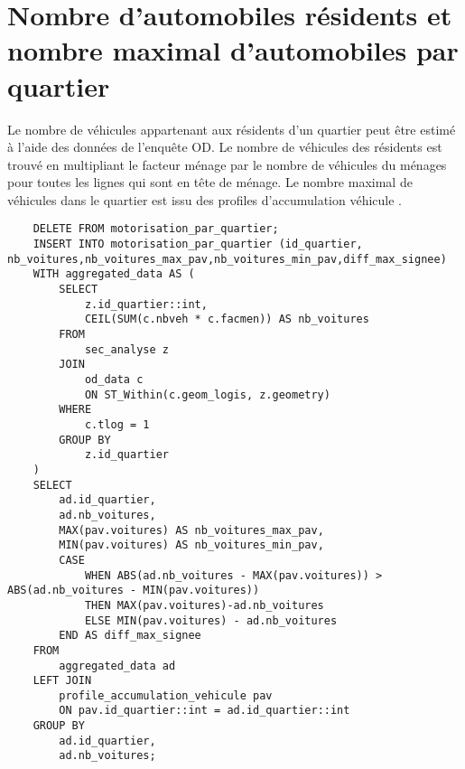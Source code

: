 \section{Nombre d'automobiles résidents et nombre maximal d'automobiles par quartier}\label{sec:annex_motorisation_par_quartier}
Le nombre de véhicules appartenant aux résidents d'un quartier peut être estimé à l'aide des données de l'enquête OD. Le nombre de véhicules des résidents est trouvé en multipliant le facteur ménage par le nombre de véhicules du ménages pour toutes les lignes qui sont en tête de ménage. Le nombre maximal de véhicules dans le quartier est issu des profiles d'accumulation véhicule \parencite{diallo_methodology_2015}.
\begin{lstlisting}
    DELETE FROM motorisation_par_quartier;
    INSERT INTO motorisation_par_quartier (id_quartier, nb_voitures,nb_voitures_max_pav,nb_voitures_min_pav,diff_max_signee)
    WITH aggregated_data AS (
        SELECT
            z.id_quartier::int,
            CEIL(SUM(c.nbveh * c.facmen)) AS nb_voitures
        FROM
            sec_analyse z
        JOIN
            od_data c
            ON ST_Within(c.geom_logis, z.geometry)
        WHERE
            c.tlog = 1
        GROUP BY
            z.id_quartier
    )
    SELECT
        ad.id_quartier,
        ad.nb_voitures,
        MAX(pav.voitures) AS nb_voitures_max_pav,
        MIN(pav.voitures) AS nb_voitures_min_pav,
        CASE
            WHEN ABS(ad.nb_voitures - MAX(pav.voitures)) > ABS(ad.nb_voitures - MIN(pav.voitures))
            THEN MAX(pav.voitures)-ad.nb_voitures
            ELSE MIN(pav.voitures) - ad.nb_voitures
        END AS diff_max_signee
    FROM
        aggregated_data ad
    LEFT JOIN
        profile_accumulation_vehicule pav
        ON pav.id_quartier::int = ad.id_quartier::int
    GROUP BY
        ad.id_quartier,
        ad.nb_voitures;
\end{lstlisting}
